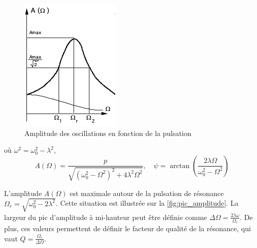 \begin{figure}
    \vspace*{-0.5cm}
    \centering
    \includegraphics[width=\linewidth]{figures/pic_amplitude.png}
    \caption{Amplitude des oscillations en fonction de la pulsation \cite{notice}}
    \label{fig:pic_amplitude}
    \vspace*{-2cm}
\end{figure}
où \(\omega^2 = \omega_0^2 - \lambda^2\), 
\begin{equation}
    A(\Omega) = \frac{p}{\sqrt{\left(\omega_0^2-\Omega^2\right)^2 + 4\lambda^2\Omega^2}}, \quad \psi = \arctan \left(\frac{2\lambda\Omega}{\omega_0^2-\Omega^2}\right)
    \label{eq:A_et_psi}
\end{equation}

L'amplitude \(A(\Omega)\) est maximale autour de la pulsation de résonance \(\Omega_r = \sqrt{\omega_0^2-2\lambda^2}\). Cette situation est illustrée sur la \autoref{fig:pic_amplitude}. La largeur du pic d'amplitude à mi-hauteur peut être définie comme \(\Delta \Omega = \frac{2 \lambda \omega}{\Omega_r}\). De plus, ces valeurs permettent de définir le facteur de qualité de la résonance, qui vaut \(Q = \frac{\Omega_r}{\Delta\Omega}\).

